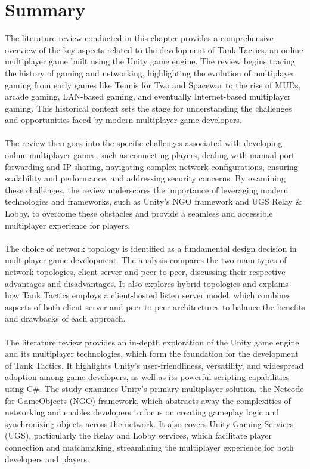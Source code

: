 \section{Summary} 
The literature review conducted in this chapter provides a comprehensive overview of the key aspects related to the development of Tank Tactics, an online multiplayer game built using the Unity game engine. The review begins tracing the history of gaming and networking, highlighting the evolution of multiplayer gaming from early games like Tennis for Two and Spacewar to the rise of MUDs, arcade gaming, LAN-based gaming, and eventually Internet-based multiplayer gaming. This historical context sets the stage for understanding the challenges and opportunities faced by modern multiplayer game developers.
\\
\noindent
\\
The review then goes into the specific challenges associated with developing online multiplayer games, such as connecting players, dealing with manual port forwarding and IP sharing, navigating complex network configurations, ensuring scalability and performance, and addressing security concerns. By examining these challenges, the review underscores the importance of leveraging modern technologies and frameworks, such as Unity's NGO framework and UGS Relay & Lobby, to overcome these obstacles and provide a seamless and accessible multiplayer experience for players.
\\
\noindent
\\
The choice of network topology is identified as a fundamental design decision in multiplayer game development. The analysis compares the two main types of network topologies, client-server and peer-to-peer, discussing their respective advantages and disadvantages. It also explores hybrid topologies and explains how Tank Tactics employs a client-hosted listen server model, which combines aspects of both client-server and peer-to-peer architectures to balance the benefits and drawbacks of each approach.
\\
\noindent
\\
The literature review provides an in-depth exploration of the Unity game engine and its multiplayer technologies, which form the foundation for the development of Tank Tactics. It highlights Unity's user-friendliness, versatility, and widespread adoption among game developers, as well as its powerful scripting capabilities using C\#. The study examines Unity's primary multiplayer solution, the Netcode for GameObjects (NGO) framework, which abstracts away the complexities of networking and enables developers to focus on creating gameplay logic and synchronizing objects across the network. It also covers Unity Gaming Services (UGS), particularly the Relay and Lobby services, which facilitate player connection and matchmaking, streamlining the multiplayer experience for both developers and players.
